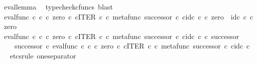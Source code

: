 \begin{isabellebody}
\ eval{\isacharunderscore}{\kern0pt}lemma\ \isamarkupfalse%
\ {\isacharparenleft}{\kern0pt}typecheck{\isacharunderscore}{\kern0pt}cfuncs{\isacharcomma}{\kern0pt}\ blast{\isacharparenright}{\kern0pt}\isanewline
\ \ \isamarkupfalse%
\ \isamarkupfalse%
\ {\isachardoublequoteopen}{\isacharparenleft}{\kern0pt}eval{\isacharunderscore}{\kern0pt}func\ {\isasymnat}\isactrlsub c\ {\isasymnat}\isactrlsub c\ {\isasymcirc}\isactrlsub c\ {\isasymlangle}zero\ {\isasymcirc}\isactrlsub c\ {\isasymbeta}\isactrlbsub {\isasymnat}\isactrlsub c\isactrlesub {\isacharcomma}{\kern0pt}ITER\ {\isasymnat}\isactrlsub c\ {\isasymcirc}\isactrlsub c\ {\isasymlangle}metafunc\ successor\ {\isasymcirc}\isactrlsub c\ {\isasymbeta}\isactrlbsub {\isasymnat}\isactrlsub c\isactrlesub {\isacharcomma}{\kern0pt}id\isactrlsub c\ {\isasymnat}\isactrlsub c{\isasymrangle}{\isasymrangle}{\isacharparenright}{\kern0pt}\ {\isasymcirc}\isactrlsub c\ zero\ {\isacharequal}{\kern0pt}\ id\isactrlsub c\ {\isasymnat}\isactrlsub c\ {\isasymcirc}\isactrlsub c\ zero{\isachardoublequoteclose}\isacommand{{\isachardot}{\kern0pt}}\isamarkupfalse%
\isanewline
\ \ \isamarkupfalse%
\ {\isachardoublequoteopen}{\isacharparenleft}{\kern0pt}eval{\isacharunderscore}{\kern0pt}func\ {\isasymnat}\isactrlsub c\ {\isasymnat}\isactrlsub c\ {\isasymcirc}\isactrlsub c\ {\isasymlangle}zero\ {\isasymcirc}\isactrlsub c\ {\isasymbeta}\isactrlbsub {\isasymnat}\isactrlsub c\isactrlesub {\isacharcomma}{\kern0pt}ITER\ {\isasymnat}\isactrlsub c\ {\isasymcirc}\isactrlsub c\ {\isasymlangle}metafunc\ successor\ {\isasymcirc}\isactrlsub c\ {\isasymbeta}\isactrlbsub {\isasymnat}\isactrlsub c\isactrlesub {\isacharcomma}{\kern0pt}id\isactrlsub c\ {\isasymnat}\isactrlsub c{\isasymrangle}{\isasymrangle}{\isacharparenright}{\kern0pt}\ {\isasymcirc}\isactrlsub c\ successor\ {\isacharequal}{\kern0pt}\isanewline
\ \ \ \ successor\ {\isasymcirc}\isactrlsub c\ eval{\isacharunderscore}{\kern0pt}func\ {\isasymnat}\isactrlsub c\ {\isasymnat}\isactrlsub c\ {\isasymcirc}\isactrlsub c\ {\isasymlangle}zero\ {\isasymcirc}\isactrlsub c\ {\isasymbeta}\isactrlbsub {\isasymnat}\isactrlsub c\isactrlesub {\isacharcomma}{\kern0pt}ITER\ {\isasymnat}\isactrlsub c\ {\isasymcirc}\isactrlsub c\ {\isasymlangle}metafunc\ successor\ {\isasymcirc}\isactrlsub c\ {\isasymbeta}\isactrlbsub {\isasymnat}\isactrlsub c\isactrlesub {\isacharcomma}{\kern0pt}id\isactrlsub c\ {\isasymnat}\isactrlsub c{\isasymrangle}{\isasymrangle}{\isachardoublequoteclose}\isanewline
\ \ \isamarkupfalse%
{\isacharparenleft}{\kern0pt}etcs{\isacharunderscore}{\kern0pt}rule\ one{\isacharunderscore}{\kern0pt}separator{\isacharparenright}{\kern0pt}\isanewline

\end{isabellebody}

